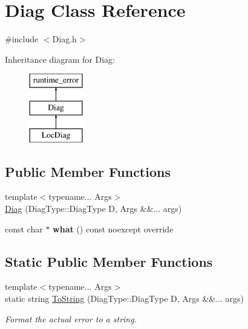 \hypertarget{class_diag}{}\section{Diag Class Reference}
\label{class_diag}


{\ttfamily \#include $<$Diag.\+h$>$}

Inheritance diagram for Diag\+:\begin{figure}[H]
\begin{center}
\leavevmode
\includegraphics[height=3.000000cm]{class_diag}
\end{center}
\end{figure}
\subsection*{Public Member Functions}
\begin{DoxyCompactItemize}
\item 
{\footnotesize template$<$typename... Args$>$ }\\\mbox{\hyperlink{class_diag_a33c4f75aee9e099724ac86e5ddfc16b9}{Diag}} (Diag\+Type\+::\+Diag\+Type D, Args \&\&... args)
\item 
\mbox{\label{class_diag_af92c9d50d431a4052995fc3aa689c5b1}} 
const char $\ast$ {\bfseries what} () const noexcept override
\end{DoxyCompactItemize}
\subsection*{Static Public Member Functions}
\begin{DoxyCompactItemize}
\item 
\mbox{\label{class_diag_a9368c50c0163dfe5ff8c44891db2acc9}} 
{\footnotesize template$<$typename... Args$>$ }\\static string \mbox{\hyperlink{class_diag_a9368c50c0163dfe5ff8c44891db2acc9}{To\+String}} (Diag\+Type\+::\+Diag\+Type D, Args \&\&... args)
\begin{DoxyCompactList}\small\item\em Format the actual error to a string. \end{DoxyCompactList}\end{DoxyCompactItemize}


